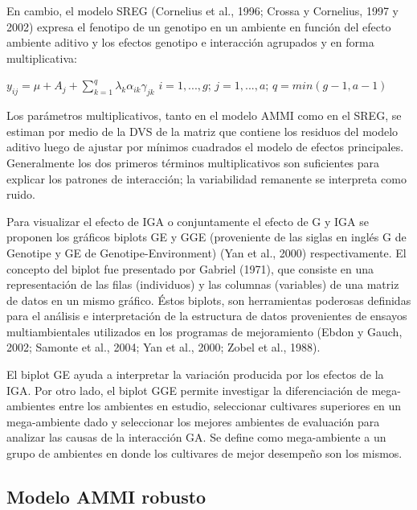 En cambio, el modelo SREG (Cornelius et al., 1996; Crossa y Cornelius, 1997 y 2002) expresa el fenotipo de un genotipo en un ambiente en función del efecto ambiente aditivo y los efectos genotipo e interacción agrupados y en forma multiplicativa:
\begin{center}
$y_{ij}= \mu +  A_j + \sum_{k=1}^q \lambda_k \alpha_{ik} \gamma_{jk}$ \hspace{0.5cm} $ i=1,...,g$;\hspace{0.15cm} $ j=1,...,a$; \hspace{0.15cm} $q=min(g-1,a-1)$
\end{center} 

Los parámetros multiplicativos, tanto en el modelo AMMI como en el SREG, se estiman por medio de la DVS de la matriz que contiene los residuos del modelo aditivo luego de ajustar por mínimos cuadrados el modelo de efectos principales. Generalmente los dos primeros términos multiplicativos son suficientes para explicar los patrones de interacción; la variabilidad remanente se interpreta como ruido. 

Para visualizar el efecto de IGA o conjuntamente el efecto de G y IGA se proponen los gráficos biplots GE y GGE (proveniente de las siglas en inglés G de Genotipe y GE de Genotipe-Environment) (Yan et al., 2000) respectivamente. El concepto del biplot fue presentado por Gabriel (1971), que consiste en una representación de las filas (individuos) y las columnas (variables) de una matriz de datos en un mismo gráfico. Éstos biplots, son herramientas poderosas definidas para el análisis e interpretación de la estructura de datos provenientes de ensayos multiambientales utilizados en los programas de mejoramiento (Ebdon y Gauch, 2002; Samonte et al., 2004; Yan et al., 2000; Zobel et al., 1988).

El biplot GE ayuda a interpretar la variación producida por los efectos de la IGA. Por otro lado, el biplot GGE permite investigar la diferenciación de mega-ambientes entre los ambientes en estudio, seleccionar cultivares superiores en un mega-ambiente dado y seleccionar los mejores ambientes de evaluación para analizar las causas de la interacción GA. Se define como mega-ambiente a un grupo de ambientes en donde los cultivares de mejor desempeño son los mismos.


\subsection{Modelo AMMI robusto}

